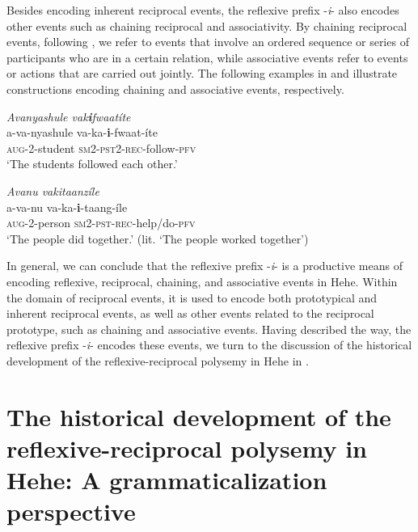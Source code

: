 \documentclass[output=paper,
            colorlinks, citecolor=brown
            ,draftmode
		  ]{langscibook}
\begin{document}
Besides encoding inherent reciprocal events, the reflexive prefix -\textit{i}{}- also encodes other events such as chaining reciprocal and associativity. By chaining reciprocal events, following \citet{Kemmer1993}, we refer to events that involve an ordered sequence or series of participants who are in a certain relation, while associative events refer to events or actions that are carried out jointly. The following examples in  and  illustrate constructions encoding chaining and associative events, respectively.  

\ea\label{ex:ngwasi:17}
\textit{Avanyashule vak}\textbf{\textit{i}}\textit{fwaatíte}\\
\gll  a-va-nyashule    va-ka-\textbf{i}{}-fwaat-íte\\
  \textsc{aug}-2-student    \textsc{sm2-pst2-rec}-follow-\textsc{pfv}\\
\glt  ‘The students followed each other.’


\ex\label{ex:ngwasi:18}
\textit{Avanu vakitaanzíle}\\
\gll a-va-nu    va-ka-\textbf{i}{}-taang-íle\\
\textsc{aug}-2-person    \textsc{sm2-pst-rec}-help/do-\textsc{pfv}\\
\glt ‘The people did together.’ (lit. ‘The people worked together’)
\z


In general, we can conclude that the reflexive prefix -\textit{i}{}- is a productive means of encoding reflexive, reciprocal, chaining, and associative events in Hehe. Within the domain of reciprocal events, it is used to encode both prototypical and inherent reciprocal events, as well as other events related to the reciprocal prototype, such as chaining and associative events. Having described the way, the reflexive prefix -\textit{i}{}- encodes these events, we turn to the discussion of the historical development of the reflexive-reciprocal polysemy in Hehe in .

\section{The historical development of the reflexive-reciprocal polysemy in Hehe: A grammaticalization perspective}\label{sec:ngwasi:3}
\end{document}
